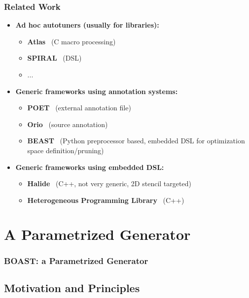 \documentclass{beamer}
\begin{document}
\begin{frame}
  \frametitle{Related Work}

  \begin{itemize}
    \item \textbf{Ad hoc autotuners (usually for libraries):}
    \begin{itemize}
      \item \textbf{Atlas}~\cite{whaley04} (C macro processing)
      \item \textbf{SPIRAL}~\cite{puschel2004spiral} (DSL)
      \item ...
    \end{itemize}
    \item \textbf{Generic frameworks using annotation systems:}
    \begin{itemize}
      \item \textbf{POET}~\cite{yi2007poet} (external annotation file)
      \item \textbf{Orio}~\cite{Hart2009:Orio} (source annotation)
      \item \textbf{BEAST}~\cite{CPE:CPE3516} (Python preprocessor based, embedded DSL for optimization space definition/pruning)
    \end{itemize}
    \item \textbf{Generic frameworks using embedded DSL:}
    \begin{itemize}
      \item \textbf{Halide}~\cite{ragan2013halide} (C++, not very generic, 2D stencil targeted)
      \item \textbf{Heterogeneous Programming Library}~\cite{F.Fabeiro:2016:WPM:2894387.2894576} (C++)
    \end{itemize}
  \end{itemize}

\end{frame}

\section{A Parametrized Generator}
\begin{frame}
\frametitle{BOAST: a Parametrized Generator}
\end{frame}

\subsection{Motivation and Principles}
\end{document}
